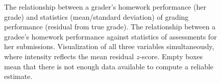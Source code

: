 \begin{figure}
\begin{center}
\;\;
\;\;
\end{center}
\caption[Relationship between grades received and grades given]{%
 The relationship between a grader's homework performance (her grade)
and statistics (mean/standard deviation) of grading performance (residual from true grade).
 The relationship between a gradee's homework performance against statistics of assessments
for her submissions.
 Visualization of all three variables simultaneously, where intensity reflects
the mean residual $z$-score.  Empty boxes mean that there is not enough data available to compute a reliable estimate.
}
\label{fig:graders}
\end{figure}

